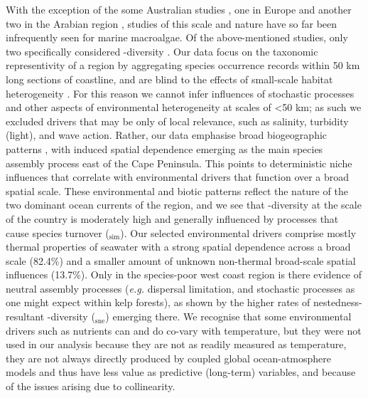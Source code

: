 \documentclass[utf8]{frontiersSCNS} %
\begin{document}
 With the exception of the some Australian studies \citep{Smale2010,Smale2011,Waters2010,Leaper2011,Wernberg2013}, one in Europe \citep{Tuya2012} and another two in the Arabian region \citep{Schils2006,Issa2014}, studies of this scale and nature have so far been infrequently seen for marine macroalgae. Of the above-mentioned studies, only two specifically considered \textbeta-diversity \citep{Leaper2011,Issa2014}. Our data focus on the taxonomic representivity of a region by aggregating species occurrence records within 50 km long sections of coastline, and are blind to the effects of small-scale habitat heterogeneity \citep[\emph{e.g.} as seen in][]{Smale2010}. For this reason we cannot infer influences of stochastic processes and other aspects of environmental heterogeneity at scales of \textless{}50 km; as such we excluded drivers that may be only of local relevance, such as salinity, turbidity (light), and wave action. Rather, our data emphasise broad biogeographic patterns \citep{Lawton1999}, with induced spatial dependence \citep{PeresNeto2010} emerging as the main species assembly process east of the Cape Peninsula. This points to deterministic niche influences that correlate with environmental drivers that function over a broad spatial scale. These environmental and biotic patterns reflect the nature of the two dominant ocean currents of the region, and we see that \textbeta-diversity at the scale of the country is moderately high and generally influenced by processes that cause species turnover (\textbeta$_{\text{sim}}$). Our selected environmental drivers comprise mostly thermal properties of seawater with a strong spatial dependence across a broad scale (82.4\%) and a smaller amount of unknown non-thermal broad-scale spatial influences (13.7\%). Only in the species-poor west coast region is there evidence of neutral assembly processes (\emph{e.g.} dispersal limitation, and stochastic processes as one might expect within kelp forests), as shown by the higher rates of nestedness-resultant \textbeta-diversity (\textbeta$_{\text{sne}}$) emerging there. We recognise that some environmental drivers such as nutrients can and do co-vary with temperature, but they were not used in our analysis because they are not as readily measured as temperature, they are not always directly produced by coupled global ocean-atmosphere models and thus have less value as predictive (long-term) variables, and because of the issues arising due to collinearity.
\end{document}
